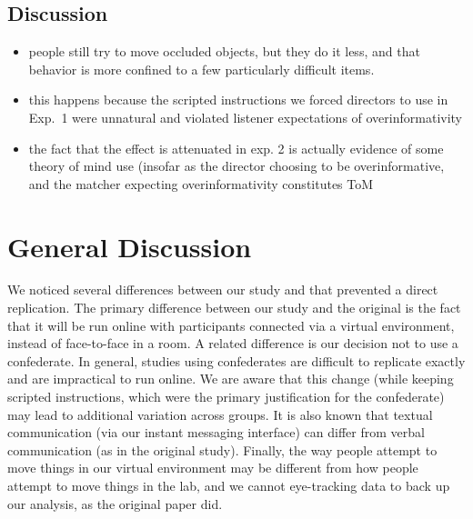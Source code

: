 \documentclass[10pt,letterpaper]{article}
\begin{document}



\subsection{Discussion}

\begin{itemize}
\item people still try to move occluded objects, but they do it less, and that behavior is more confined to a few particularly difficult items.
\item this happens because the scripted instructions we forced directors to use in Exp.~1 were unnatural and violated listener expectations of overinformativity
\item the fact that the effect is attenuated in exp. 2 is actually evidence of some theory of mind use (insofar as the director choosing to be overinformative, and the matcher expecting overinformativity constitutes ToM
\end{itemize}

\section{General Discussion}

We noticed several differences between our study and  that prevented a direct replication. The primary difference between our study and the original is the fact that it will be run online with participants connected via a virtual environment, instead of face-to-face in a room. A related difference is our decision not to use a confederate. In general, studies using confederates are difficult to replicate exactly and are impractical to run online. We are aware that this change (while keeping scripted instructions, which were the primary justification for the confederate) may lead to additional variation across groups. It is also known that textual communication (via our instant messaging interface) can differ from verbal communication (as in the original study). Finally, the way people attempt to move things in our virtual environment may be different from how people attempt to move things in the lab, and we cannot eye-tracking data to back up our analysis, as the original paper did.
\end{document}
